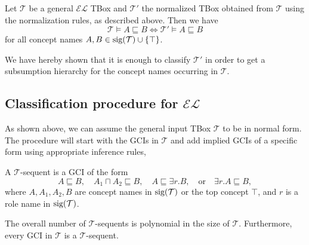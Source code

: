 \begin{corollary}
	Let $\mathcal{T}$ be a general $\mathcal{EL}$ TBox and $\mathcal{T}'$ the normalized TBox obtained from $\mathcal{T}$ 
	using the normalization rules, as described above.
	Then we have
	\[
	\mathcal{T} \vDash A \sqsubseteq B \iff \mathcal{T}' \vDash A \sqsubseteq B
	\]
	for all concept names $A,B \in \operatorname{\text{sig}}(\mathcal{T}) \cup \left\{ \top \right\}$.
\end{corollary}
We have hereby shown that it is enough to classify $\mathcal{T}'$
in order to get a subsumption hierarchy for the concept names occurring in $\mathcal{T}$.

\subsection{Classification procedure for $\mathcal{EL}$}
As shown above, we can assume the general input TBox $\mathcal{T}$ to be in normal form.
The procedure will start with the GCIs in $\mathcal{T}$ and add implied GCIs of a specific form using appropriate inference rules,

\begin{definition}
	A $\mathcal{T}$-sequent is a GCI of the form
	\[
	A \sqsubseteq B, \quad A_1 \sqcap A_2 \sqsubseteq B, \quad A \sqsubseteq \exists r.B,\quad \text{or} \quad \exists r.A \sqsubseteq B
	,\]
	where $A, A_1, A_2, B$ are concept names in $\operatorname{\text{sig}}(\mathcal{T})$ or the top concept $\top$,
	and $r$ is a role name in $\operatorname{\text{sig}}(\mathcal{T})$.
\end{definition}
\begin{note}
	The overall number of $\mathcal{T}$-sequents is polynomial in the size of $\mathcal{T}$.
	Furthermore, every GCI in $\mathcal{T}$ is a $\mathcal{T}$-sequent.
\end{note}
